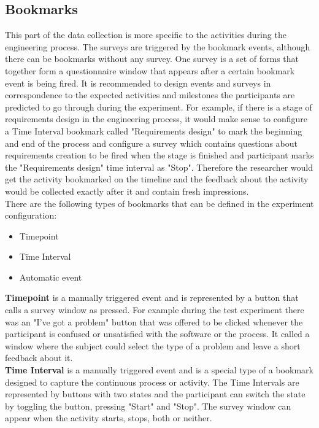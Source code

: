 \subsection{Bookmarks}\label{subsec:bookmarks}
This part of the data collection is more specific to the activities during the engineering process. The surveys are triggered by the bookmark events, although there can be bookmarks without any survey. One survey is a set of forms that together form a questionnaire window that appears after a certain bookmark event is being fired. It is recommended to design events and surveys in correspondence to the expected activities and milestones the participants are predicted to go through during the experiment. For example, if there is a stage of requirements design in the engineering process, it would make sense to configure a Time Interval bookmark called "Requirements design" to mark the beginning and end of the process and configure a survey which contains questions about requirements creation to be fired when the stage is finished and participant marks the "Requirements design" time interval as "Stop". Therefore the researcher would get the activity bookmarked on the timeline and the feedback about the activity would be collected exactly after it and contain fresh impressions.\\

There are the following types of bookmarks that can be defined in the experiment configuration:

\begin{itemize}
\item Timepoint
\item Time Interval
\item Automatic event
\end{itemize}

\textbf{Timepoint} is a manually triggered event and is represented by a button that calls a survey window as pressed. For example during the test experiment there was an "I've got a problem" button that was offered to be clicked whenever the participant is confused or unsatisfied with the software or the process. It called a window where the subject could select the type of a problem and leave a short feedback about it. \\

\textbf{Time Interval} is a manually triggered event and is a special type of a bookmark designed to capture the continuous process or activity. The Time Intervals are represented by buttons with two states and the participant can switch the state by toggling the button, pressing "Start" and "Stop". The survey window can appear when the activity starts, stops, both or neither.\\

